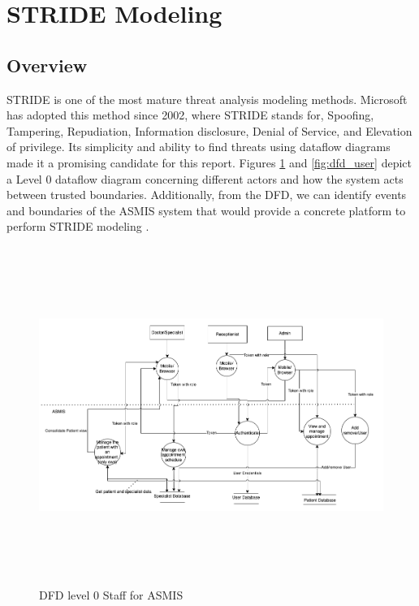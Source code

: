 \section{STRIDE Modeling}
\subsection{Overview}
STRIDE is one of the most mature threat analysis modeling methods. Microsoft has adopted this method since 2002, where STRIDE stands for, Spoofing, Tampering, Repudiation, Information disclosure, Denial of Service, and Elevation of privilege. Its simplicity and ability to find threats using dataflow diagrams made it a promising candidate for this report.\newline\newline
Figures \ref{fig:dfd_staff} and \ref{fig:dfd_user} depict a Level 0 dataflow diagram concerning different actors and how the system acts between trusted boundaries. Additionally, from the DFD, we can identify events and boundaries of the ASMIS system that would provide a concrete platform to perform STRIDE modeling \citep[p.~1]{shevchenko2018threat}.

\begin{figure}[h!]
\centering
\includegraphics[width=16cm, height=11cm]{pics/dfd_staff.png}
\caption{DFD level 0 Staff for ASMIS}\label{fig:dfd_staff}
\end{figure}

